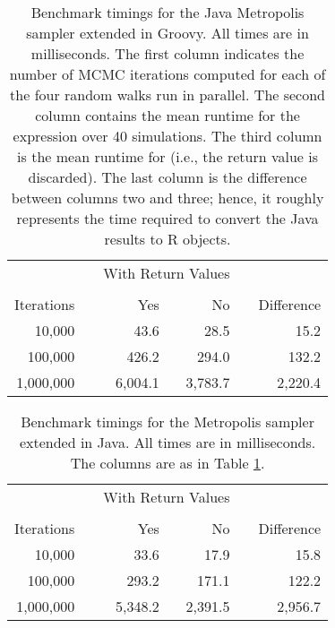 
\begin{table}[h!]
\centering
\caption{Benchmark timings for the Java Metropolis sampler extended in Groovy. All times are in milliseconds. The first column indicates the number of MCMC iterations computed for each of the four random walks run in parallel. The second column contains the mean runtime for the expression  over 40 simulations. The third column is the mean runtime for  (i.e., the return value is discarded). The last column is the difference between columns two and three; hence, it roughly represents the time required to convert the Java results to R objects.}
\begin{tabular}{rrrrrr}
\toprule
& & \multicolumn{2}{c}{With Return Values} & & \\
\cline{3-4} \\[-8pt]
Iterations & & \multicolumn{1}{r}{Yes} & \multicolumn{1}{r}{No} & & Difference \\ \midrule 
10,000 & & 43.6 & 28.5 & & 15.2 \\
100,000 & & 426.2 & 294.0 & & 132.2 \\
1,000,000 & & 6,004.1 & 3,783.7 & & 2,220.4 \\ \bottomrule
\end{tabular}
\label{tab:mcmcgroovy}
\end{table}


\begin{table}[h!]
\centering
\caption{Benchmark timings for the Metropolis sampler extended in Java. All times are in milliseconds. The columns are as in Table \ref{tab:mcmcgroovy}.}
\begin{tabular}{rrrrrr}
\toprule
& & \multicolumn{2}{c}{With Return Values} & & \\
\cline{3-4} \\[-8pt]
Iterations & & \multicolumn{1}{r}{Yes} & \multicolumn{1}{r}{No} & & Difference \\ \midrule
10,000 & & 33.6 & 17.9 & & 15.8 \\
100,000 & & 293.2 & 171.1 & & 122.2 \\
1,000,000 & & 5,348.2 & 2,391.5 & & 2,956.7 \\ \bottomrule
\end{tabular}
\label{tab:mcmcjava}
\end{table}

